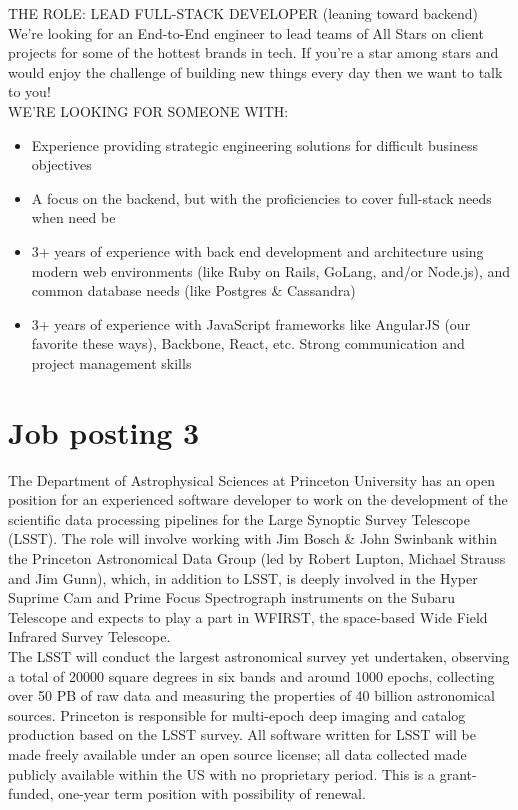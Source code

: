THE ROLE: LEAD FULL-STACK DEVELOPER (leaning toward backend)\\

We're looking for an End-to-End engineer to lead teams of All Stars on client projects for some of the hottest brands in tech. If you're a star among stars and would enjoy the challenge of building new things every day then we want to talk to you!\\

\noindent WE'RE LOOKING FOR SOMEONE WITH:
\begin{itemize}
\item Experience providing strategic engineering solutions for difficult business objectives
\item A focus on the backend, but with the proficiencies to cover full-stack needs when need be
\item 3+ years of experience with back end development and architecture using modern web environments (like Ruby on Rails, GoLang, and/or Node.js), and common database needs (like Postgres \& Cassandra)
\item 3+ years of experience with JavaScript frameworks like AngularJS (our favorite these ways), Backbone, React, etc. Strong communication and project management skills
\end{itemize}

\section{Job posting 3}\label{sec:job-posting-three}
The Department of Astrophysical Sciences at Princeton University has an open position for an experienced software developer to work on the development of the scientific data processing pipelines for the Large Synoptic Survey Telescope (LSST). The role will involve working with Jim Bosch \& John Swinbank within the Princeton Astronomical Data Group (led by Robert Lupton, Michael Strauss and Jim Gunn), which, in addition to LSST, is deeply involved in the Hyper Suprime Cam and Prime Focus Spectrograph instruments on the Subaru Telescope and expects to play a part in WFIRST, the space-based Wide Field Infrared Survey Telescope.\\

The LSST will conduct the largest astronomical survey yet undertaken, observing a total of 20000 square degrees in six bands and around 1000 epochs, collecting over 50 PB of raw data and measuring the properties of 40 billion astronomical sources. Princeton is responsible for multi-epoch deep imaging and catalog production based on the LSST survey. All software written for LSST will be made freely available under an open source license; all data collected made publicly available within the US with no proprietary period. This is a grant-funded, one-year term position with possibility of renewal.\\

